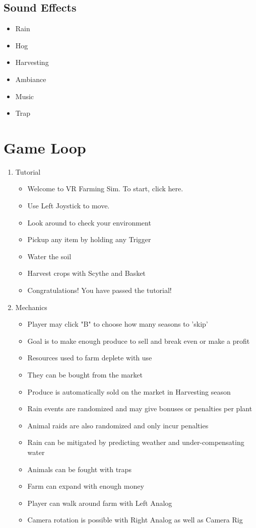 \documentclass{article}
\begin{document}
\subsection{Sound Effects}
\begin{itemize} %
\item Rain
\item Hog
\item Harvesting
\item Ambiance
\item Music
\item Trap
\end{itemize} %
\section{Game Loop}
\begin{enumerate}
\item Tutorial
\begin{itemize} %
\item Welcome to VR Farming Sim. To start, click here.
\item Use Left Joystick to move.
\item Look around to check your environment
\item Pickup any item by holding any Trigger
\item Water the soil
\item Harvest crops with Scythe and Basket
\item Congratulations! You have passed the tutorial!
\end{itemize} %
\item Mechanics
\begin{itemize} %
\item Player may click "B" to choose how many seasons to 'skip'
\item Goal is to make enough produce to sell and break even or make a profit
\item Resources used to farm deplete with use
\item They can be bought from the market
\item Produce is automatically sold on the market in Harvesting season
\item Rain events are randomized and may give bonuses or penalties per plant
\item Animal raids are also randomized and only incur penalties
\item Rain can be mitigated by predicting weather and under-compensating water
\item Animals can be fought with traps
\item Farm can expand with enough money
\item Player can walk around farm with Left Analog
\item Camera rotation is possible with Right Analog as well as Camera Rig
\end{itemize} %
\end{enumerate} %
\end{document}
